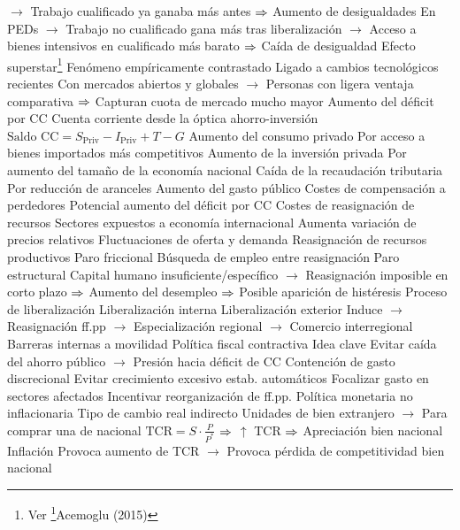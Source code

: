 \documentclass{nuevotema}
\begin{document}
\begin{esquemal}
				\4[] $\to$ Trabajo cualificado ya ganaba más antes
				\4[] $\then$ Aumento de desigualdades
				\4[] En PEDs
				\4[] $\to$ Trabajo no cualificado gana más tras liberalización
				\4[] $\to$ Acceso a bienes intensivos en cualificado más barato
				\4[] $\then$ Caída de desigualdad
				\4 Efecto superstar\footnote{Ver \footnote{https://economics.mit.edu/files/10480}{Acemoglu (2015)}}
				\4[] Fenómeno empíricamente contrastado
				\4[] Ligado a cambios tecnológicos recientes
				\4[] Con mercados abiertos y globales
				\4[] $\to$ Personas con ligera ventaja comparativa
				\4[] $\then$ Capturan cuota de mercado mucho mayor
			\3 Aumento del déficit por CC
				\4 Cuenta corriente desde la óptica ahorro-inversión
				\4[] $\text{Saldo CC} = S_\text{Priv} - I_\text{Priv}+T - G$
				\4 Aumento del consumo privado
				\4[] Por acceso a bienes importados más competitivos
				\4 Aumento de la inversión privada
				\4[] Por aumento del tamaño de la economía nacional
				\4 Caída de la recaudación tributaria
				\4[] Por reducción de aranceles
				\4 Aumento del gasto público
				\4[] Costes de compensación a perdedores
				\4[$\then$] Potencial aumento del déficit por CC
			\3 Costes de reasignación de recursos
				\4 Sectores expuestos a economía internacional
				\4[] Aumenta variación de precios relativos
				\4[] Fluctuaciones de oferta y demanda
				\4 Reasignación de recursos productivos
				\4 Paro friccional
				\4[] Búsqueda de empleo entre reasignación
				\4 Paro estructural
				\4[] Capital humano insuficiente/específico
				\4[] $\to$ Reasignación imposible en corto plazo
				\4[] $\then$ Aumento del desempleo
				\4[] $\then$ Posible aparición de histéresis
		\2 Proceso de liberalización
			\3 Liberalización interna
				\4 Liberalización exterior
				\4[] Induce
				\4[] $\to$ Reasignación ff.pp
				\4[] $\to$ Especialización regional
				\4[] $\to$ Comercio interregional
				\4 Barreras internas a movilidad
			\3 Política fiscal contractiva
				\4 Idea clave
				\4[] Evitar caída del ahorro público
				\4[] $\to$ Presión hacia déficit de CC
				\4 Contención de gasto discrecional
				\4 Evitar crecimiento excesivo estab. automáticos
				\4 Focalizar gasto en sectores afectados
				\4 Incentivar reorganización de ff.pp.
			\3 Política monetaria no inflacionaria
				\4 Tipo de cambio real indirecto
				\4[] Unidades de bien extranjero
				\4[] $\to$ Para comprar una de nacional
				\4[] $\text{TCR} = S \cdot \frac{P}{P^*} $
				\4[] $\then$ $\uparrow$ TCR $\then$ Apreciación bien nacional
				\4 Inflación
				\4[] Provoca aumento de TCR
				\4[] $\to$ Provoca pérdida de competitividad bien nacional

\end{esquemal}
\end{document}
